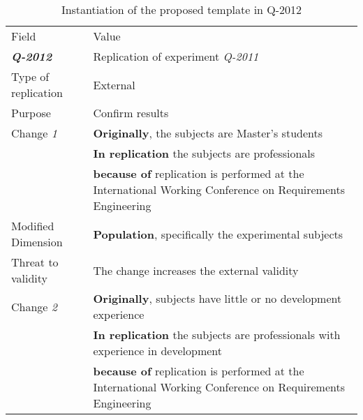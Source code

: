 \begin{table*}[h]
  \caption{Instantiation of the proposed template in Q-2012}
\label{tab:plantEng}
  \centering

\begin{tabularx}{\textwidth}{
  >{\hsize=0.3\hsize}X
  >{\hsize=0.8\hsize}X}
  
    \noalign{\smallskip}\hline\noalign{\smallskip}
  
  Field &  Value  \\ 
  \noalign{\smallskip}\hline\noalign{\smallskip}
  
\textbf {\textit{Q-2012}} &  Replication of experiment \textit{Q-2011 }    \\
Type of replication &  External   \\  
Purpose  & Confirm results \\   \hline

    Change \textit{1}   & \textbf{Originally}, the subjects are Master's students \\& \textbf{In replication} the subjects are professionals   \\& \textbf{because of} replication is performed at the International Working Conference on Requirements Engineering \\
    
    Modified Dimension & 
    \textbf{Population}, specifically the experimental subjects \\   
    Threat to validity & The change increases the external validity  \\  \hline
  
    Change \textit{2}   & \textbf{Originally}, subjects have little or no development experience \\& \textbf{In replication} the subjects are professionals with experience in development  \\& \textbf{because of} replication is performed at the International Working Conference on Requirements Engineering \\ 


\end{tabularx}
\end{table*}
